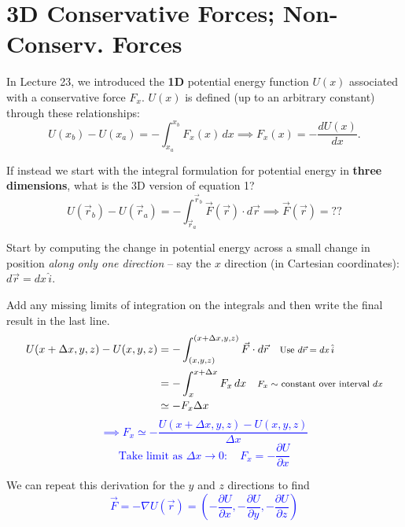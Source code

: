 \documentclass[11pt, letterpaper, openany]{book}
\newenvironment{exercise}[1][Exercise]{%
  \tcolorbox[blanker, breakable, left=1em,
    before skip=1em, after skip=1em,
    borderline west={3pt}{0pt}{PhysNavy},
    colback=PhysCream,
    before upper={\textcolor{PhysNavy}{\sffamily\bfseries #1:}\space}
  ]%
}{%
  \endtcolorbox%
}
\begin{document}
\chapter{3D Conservative Forces; Non-Conserv. Forces}

In Lecture 23, we introduced the \textbf{1D} potential energy function $U(x)$ associated with a conservative force $F_x$. $U(x)$ is defined (up to an arbitrary constant) through these relationships:
\[ U(x_b) - U(x_a) = -\int_{x_a}^{x_b} F_x(x)\,dx \implies F_x(x) = -\frac{dU(x)}{dx}. \tag{1} \]

If instead we start with the integral formulation for potential energy in \textbf{three dimensions}, what is the 3D version of equation 1?
\[ U(\vec{r}_b) - U(\vec{r}_a) = -\int_{\vec{r}_a}^{\vec{r}_b} \vec{F}(\vec{r}) \cdot d\vec{r} \implies \vec{F}(\vec{r}) = \text{??} \]

Start by computing the change in potential energy across a small change in position \textit{along only one direction} -- say the $x$ direction (in Cartesian coordinates): $d\vec{r} = dx\,\hat{i}$.

\begin{exercise}[Exercise 1]
Add any missing limits of integration on the integrals and then write the final result in the last line.
\textcolor{blue}{
\begin{align*}
    U(x + \Delta x, y, z) - U(x, y, z) &= -\int_{(x,y,z)}^{(x+\Delta x, y, z)} \vec{F} \cdot d\vec{r} \quad \text{\footnotesize{Use $d\vec{r} = dx\,\hat{i}$}} \\
    &= -\int_x^{x+\Delta x} F_x\,dx \quad \text{\footnotesize{$F_x \sim$ constant over interval $dx$}} \\
    &\simeq -F_x \Delta x
\end{align*}
\[ \implies F_x \simeq -\frac{U(x + \Delta x, y, z) - U(x, y, z)}{\Delta x} \]
\[ \text{Take limit as } \Delta x \to 0: \quad F_x = -\frac{\partial U}{\partial x} \]
}
\end{exercise}

We can repeat this derivation for the $y$ and $z$ directions to find
\textcolor{blue}{\[ \vec{F} = -\nabla U(\vec{r}) = \left( -\frac{\partial U}{\partial x}, -\frac{\partial U}{\partial y}, -\frac{\partial U}{\partial z} \right) \]}
\end{document}
